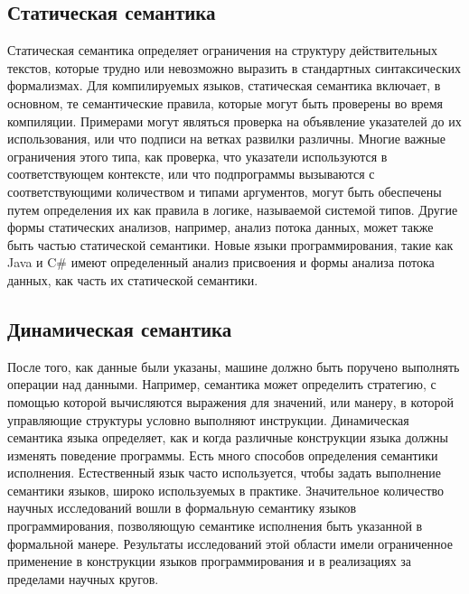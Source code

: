 \subsection{Статическая семантика}
Статическая семантика определяет ограничения на структуру действительных
текстов, которые трудно или невозможно выразить в стандартных синтаксических
формализмах. Для компилируемых языков, статическая семантика включает, в
основном, те семантические правила, которые могут быть проверены во время
компиляции. Примерами могут являться проверка на объявление указателей до их
использования, или что подписи на ветках развилки различны. Многие важные
ограничения этого типа, как проверка, что указатели используются в
соответствующем контексте, или что подпрограммы вызываются с соответствующими
количеством и типами аргументов, могут быть обеспечены путем определения их
как правила в логике, называемой системой типов. Другие формы статических
анализов, например, анализ потока данных, может также быть частью статической
семантики. Новые языки программирования, такие как Java и C\# имеют
определенный анализ присвоения и формы анализа потока данных, как часть их
статической семантики.

\subsection{Динамическая семантика}
После того, как данные были указаны, машине должно быть поручено выполнять
операции над данными. Например, семантика может определить стратегию, с
помощью которой вычисляются выражения для значений, или манеру, в которой
управляющие структуры условно выполняют инструкции. Динамическая семантика
языка определяет, как и когда различные конструкции языка должны изменять
поведение программы. Есть много способов определения семантики исполнения.
Естественный язык часто используется, чтобы задать выполнение семантики
языков, широко используемых в практике. Значительное количество научных
исследований вошли в формальную семантику языков программирования, позволяющую
семантике исполнения быть указанной в формальной манере. Результаты
исследований этой области имели ограниченное применение в конструкции языков
программирования и в реализациях за пределами научных кругов.

